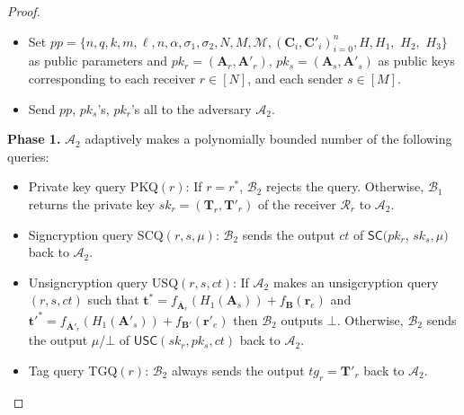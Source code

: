 \documentclass[a4paper,11pt,onecolumn]{elsarticle}
\def\bf{\mathbf}
\begin{document}
\begin{proof}
\begin{description}
\begin{itemize}
						  	
						  	\item Set $pp=\{n,q, k, m,\ell, n, \alpha, \sigma_1, \sigma_2, N, M,  \mathcal{M}, (\bf{C}_i, \bf{C}'_i)_{i=0}^{n},H, H_1, $ $H_2, $ $H_3\}$ as public parameters and  $pk_{r}=(\mathbf{A}_r, \mathbf{A}'_r)$, $pk_{s}=(\mathbf{A}_s, \mathbf{A}'_s)$ as public keys corresponding to each receiver $r \in [N]$, and each sender $s\in [M]$.
						  	\item Send $pp$, $pk_s$'s, $pk_r$'s all to the adversary  $\mathcal{A}_2$.
						  \end{itemize}	
				\textbf{Phase 1.}  $\mathcal{A}_2$ adaptively makes a polynomially bounded number of the following queries:
				\begin{itemize}
					\item Private key query  PKQ$(r)$: If $r=r^*$, $\mathcal{B}_2$ rejects the query. Otherwise, $\mathcal{B}_1$  returns the private key $sk_{r}=(\textbf{T}_r, \textbf{T}'_r)$ of the receiver $\mathcal{R}_{r}$  to $\mathcal{A}_2$. 
					\item Signcryption query SCQ$(r,s,\mu)$: $\mathcal{B}_2$ sends the output $ct$ of $\textsf{SC}(pk_{r}$, $sk_{s},\mu)$ back to $\mathcal{A}_2$.
					\item Unsigncryption query   USQ$(r,s,ct)$: If  $\mathcal{A}_2$ makes an unsigcryption query  $(r, s,ct)$ such that $\textbf{t}^*=f_{\overline{\textbf{A}}_r}(H_1(\textbf{A}_s))+f_{\textbf{B}}(\textbf{r}_e)$ and $\textbf{t}'^*=f_{\overline{\textbf{A}}'_r}(H_1(\textbf{A}'_s))+f_{\textbf{B}'}(\textbf{r}'_e)$ then  $\mathcal{B}_2$ outputs $\bot$. Otherwise, $\mathcal{B}_2$ sends the output $\mu$/$\bot$ of $\textsf{USC}(sk_{r},pk_{s},ct)$ back to $\mathcal{A}_2$. 
					\item Tag query TGQ$(r)$: $\mathcal{B}_2$ always sends the output $tg_{r}=\textbf{T}'_r$ back to $\mathcal{A}_2$. 
				\end{itemize}
				

\end{description}
\end{proof}
\end{document}
